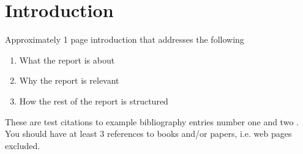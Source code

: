 \documentclass[Preamble]{subfiles}
\begin{document}
\chapter{Introduction}
Approximately 1 page introduction that addresses the following
\begin{enumerate}
\item What the report is about
\item Why the report is relevant
\item How the rest of the report is structured
\end{enumerate}

These are test citations to example bibliography entries number one
\cite{1989_graham_1} and two \cite{2003_simpson_1}. You should have at
least 3 references to books and/or papers, i.e. web pages excluded.
\end{document}
